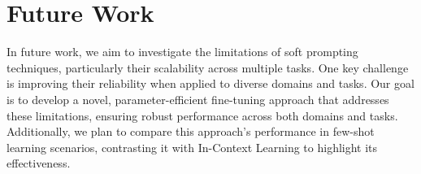 \documentclass{article}
\begin{document}
\section{Future Work}
In future work, we aim to investigate the limitations of soft prompting techniques, particularly their scalability across multiple tasks. One key challenge is improving their reliability when applied to diverse domains and tasks. Our goal is to develop a novel, parameter-efficient fine-tuning approach that addresses these limitations, ensuring robust performance across both domains and tasks. Additionally, we plan to compare this approach's performance in few-shot learning scenarios, contrasting it with In-Context Learning to highlight its effectiveness.

% 
% 




\end{document}
